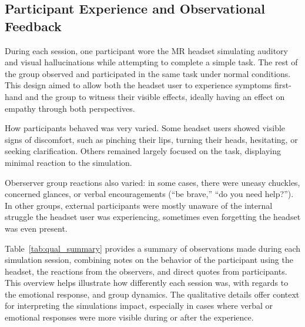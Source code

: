 \subsection{Participant Experience and Observational Feedback}

During each session, one participant wore the MR headset simulating auditory and visual hallucinations while attempting to complete a simple task. The rest of the group observed and participated in the same task under normal conditions. This design aimed to allow both the headset user to experience symptoms first-hand and the group to witness their visible effects, ideally having an effect on empathy through both perspectives.

\vspace{1em}

How participants behaved was very varied. Some headset users showed visible signs of discomfort, such as pinching their lips, turning their heads, hesitating, or seeking clarification. Others remained largely focused on the task, displaying minimal reaction to the simulation.

\vspace{1em}

Oberserver group reactions also varied: in some cases, there were uneasy chuckles, concerned glances, or verbal encouragements (“be brave,” “do you need help?”). In other groups, external participants were mostly unaware of the internal struggle the headset user was experiencing, sometimes even forgetting the headset was even present.

\vspace{1em}

Table~\ref{tab:qual_summary} provides a summary of observations made during each simulation session, combining notes on the behavior of the participant using the headset, the reactions from the observers, and direct quotes from participants. This overview helps illustrate how differently each session was, with regards to the emotional response, and group dynamics. The qualitative details offer context for interpreting the simulations impact, especially in cases where verbal or emotional responses were more visible during or after the experience.

